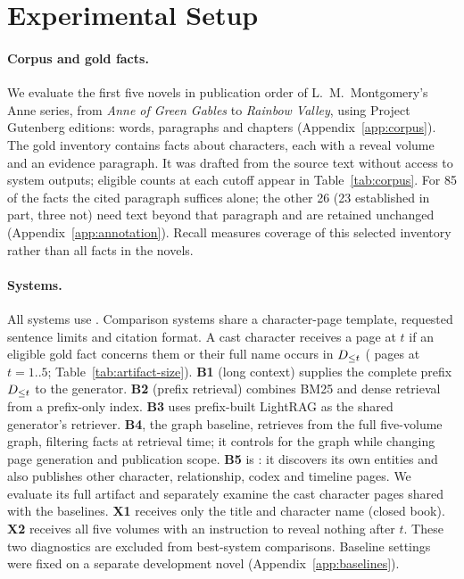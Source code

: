 \section{Experimental Setup}
\label{sec:setup}

\paragraph{Corpus and gold facts.}
We evaluate the first five novels in publication order of L.~M.~Montgomery's Anne series,
from \emph{Anne of Green Gables} to \emph{Rainbow Valley}, using Project Gutenberg editions:
 words,  paragraphs and  chapters
(Appendix~\ref{app:corpus}).
The gold inventory contains  facts about  characters,
each with a reveal volume and an evidence paragraph. It was drafted from the source text
without access to system outputs; eligible counts at each cutoff appear in
Table~\ref{tab:corpus}.
\ifnwhuman For 85 of the  facts the cited paragraph suffices alone;
the other 26 (23 established in part, three not) need text beyond that paragraph and
are retained unchanged (Appendix~\ref{app:annotation}).\fi{}
Recall measures coverage of this selected inventory rather than all facts in the novels.

\paragraph{Systems.}
All systems use . Comparison systems share a character-page template,
requested sentence limits and citation format. A cast character receives a page at $t$ if an eligible
gold fact concerns them or their full name occurs in $D_{\le t}$
( pages at $t=1..5$; Table~\ref{tab:artifact-size}).
\textbf{B1} (long context) supplies the complete prefix $D_{\le t}$ to the generator.
\textbf{B2} (prefix retrieval) combines BM25 and dense retrieval from a prefix-only index.
\textbf{B3} uses prefix-built LightRAG \citep{guo2024lightrag} as the shared generator's retriever.
\textbf{B4}, the graph baseline, retrieves from the full five-volume \sys graph, filtering
facts at retrieval time; it controls for the graph while changing page generation and
publication scope.
\textbf{B5} is \sys: it discovers its own entities and also publishes other character,
relationship, codex and timeline pages. We evaluate its full artifact and separately examine
the cast character pages shared with the baselines.
\textbf{X1} receives only the title and character name (closed book).
\textbf{X2} receives all five volumes with an instruction to reveal nothing after $t$.
These two diagnostics are excluded from best-system comparisons. Baseline settings were
fixed on a separate development novel (Appendix~\ref{app:baselines}).

